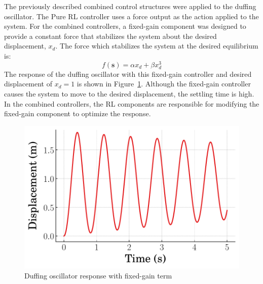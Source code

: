 The previously described combined control structures were applied to the duffing oscillator. The Pure RL controller uses a force output as the action applied to the system. For the combined controllers, a fixed-gain component was designed to provide a constant force that stabilizes the system about the desired displacement, $x_d$. The force which stabilizes the system at the desired equilibrium is:
%
\begin{equation}
f(\boldsymbol{s})=\alpha x_d + \beta x^3_d
\label{eq_chap_2:feedforward}
\end{equation}
%
The response of the duffing oscillator with this fixed-gain controller and desired displacement of $x_d=1$ is shown in Figure~\ref{fig:duffing_feedforward}. Although the fixed-gain controller causes the system to move to the desired displacement, the settling time is high. In the combined controllers, the RL components are responsible for modifying the fixed-gain component to optimize the response.
%
\begin{figure}[tb]
    \centering
      \includegraphics[width=0.65\columnwidth]{figures/figures_RL_model_based_control/time_responses_duffing/duffing_FF/Displacement_1_init_0_steps}
      \vspace{-2ex}
      \caption{Duffing oscillator response with fixed-gain term}
      \label{fig:duffing_feedforward}
\end{figure}
